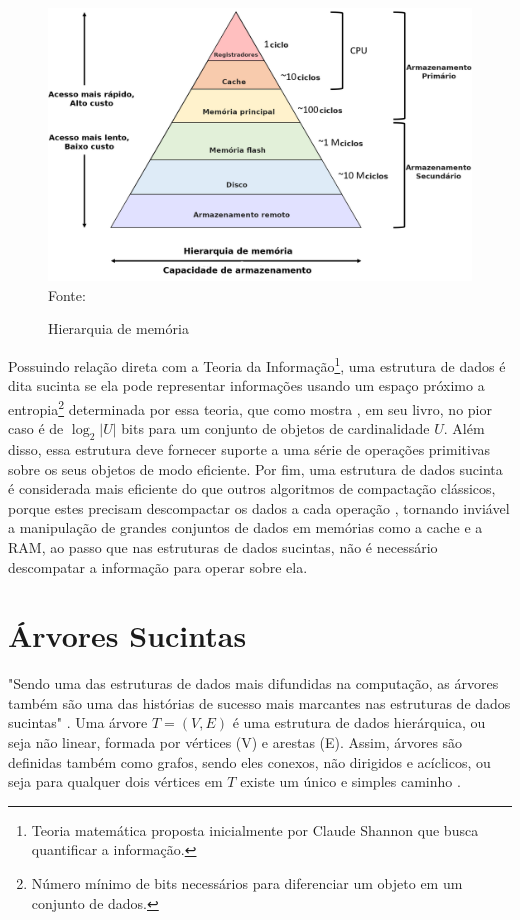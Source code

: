 \begin{figure}[!ht]
    \centering
    \caption{Hierarquia de memória}
    \includegraphics[scale=0.63]{images/hierarquia-memory-2.png}
    \footnotesize{Fonte: \cite{memory-hierarchy}}
  \label{fig:hierarquia-de-memoria}
\end{figure}

Possuindo relação direta com a Teoria da Informação\footnote{Teoria matemática proposta inicialmente por Claude Shannon que busca quantificar a informação.}, uma estrutura de dados é dita sucinta se ela pode representar informações usando um espaço próximo a entropia\footnote{Número mínimo de bits necessários para diferenciar um objeto em um conjunto de dados.} determinada por essa teoria, que como mostra \cite{book-compact-data-structures},  em seu livro, no pior caso é de $\log_2 |U|$ bits para um conjunto de objetos de cardinalidade $U$. Além disso, essa estrutura deve fornecer suporte a uma série de operações primitivas sobre os seus objetos de modo eficiente. Por fim, uma estrutura de dados sucinta é considerada mais eficiente do que outros algoritmos de compactação clássicos, porque estes precisam descompactar os dados a cada operação \citep{coira-feranando}, tornando inviável a manipulação de grandes conjuntos de dados em memórias como a cache e a RAM, ao passo que nas estruturas de dados sucintas, não é necessário descompatar a informação para operar sobre ela.


\section{Árvores Sucintas}
"Sendo uma das estruturas de dados mais difundidas na computação, as árvores também são uma das histórias de sucesso mais marcantes nas estruturas de dados sucintas" \cite[tradução nossa]{book-compact-data-structures}. Uma árvore $T=(V,E)$ é uma estrutura de dados hierárquica, ou seja não linear, formada por vértices (V) e arestas (E). Assim, árvores são definidas também como grafos, sendo eles conexos, não dirigidos e acíclicos, ou seja para qualquer dois vértices em $T$ existe um único e simples caminho \citep{book-algoritmos-teoria-pratica}.



